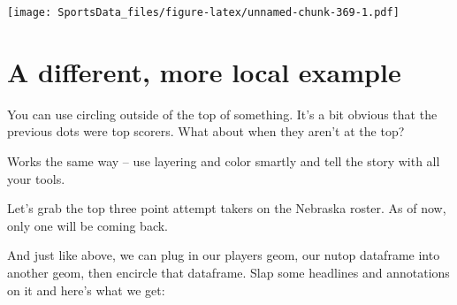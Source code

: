 \documentclass[
]{book}
\newenvironment{Shaded}{\begin{snugshade}}{\end{snugshade}}
\newcommand{\DataTypeTok}[1]{\textcolor[rgb]{0.13,0.29,0.53}{#1}}
\newcommand{\DecValTok}[1]{\textcolor[rgb]{0.00,0.00,0.81}{#1}}
\newcommand{\KeywordTok}[1]{\textcolor[rgb]{0.13,0.29,0.53}{\textbf{#1}}}
\newcommand{\NormalTok}[1]{#1}
\newcommand{\OperatorTok}[1]{\textcolor[rgb]{0.81,0.36,0.00}{\textbf{#1}}}
\newcommand{\StringTok}[1]{\textcolor[rgb]{0.31,0.60,0.02}{#1}}
\begin{document}
\texttt{[image: SportsData\_files/figure-latex/unnamed-chunk-369-1.pdf]}

\hypertarget{a-different-more-local-example}{%
\section{A different, more local example}\label{a-different-more-local-example}}

You can use circling outside of the top of something. It's a bit obvious that the previous dots were top scorers. What about when they aren't at the top?

Works the same way -- use layering and color smartly and tell the story with all your tools.

Let's grab the top three point attempt takers on the Nebraska roster. As of now, only one will be coming back.

\begin{Shaded}
\end{Shaded}

And just like above, we can plug in our players geom, our nutop dataframe into another geom, then encircle that dataframe. Slap some headlines and annotations on it and here's what we get:
\end{document}
